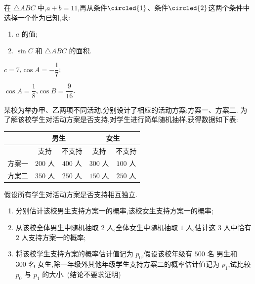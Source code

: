 \begin{problem}
在 \(\triangle ABC\) 中,\(a+b=11\),再从条件\(\circled{1}\)、条件\(\circled{2}\)这两个条件中选择一个作为已知,求:

\begin{enumerate}
    \item \(a\) 的值;
    \item \(\sin C\) 和 \(\triangle ABC\) 的面积.
\end{enumerate}

\begin{circlelist}
\item \(c=7\),\(\cos A=-\dfrac17\);

\item \(\cos A=\dfrac18\),\(\cos B=\dfrac{9}{16}\).
\end{circlelist}
\end{problem}

\begin{problem}
某校为举办甲、乙两项不同活动,分别设计了相应的活动方案:方案一、方案二. 为了解该校学生对活动方案是否支持,对学生进行简单随机抽样,获得数据如下表:

\begin{center}
\begin{tabular}{c|cc|cc}
\hline
& \multicolumn{2}{c|}{男生} & \multicolumn{2}{c}{女生} \\
\hline
& 支持 & 不支持 & 支持 & 不支持 \\
\hline
方案一 & \(200\text{ 人}\) & \(400\text{ 人}\) & \(300\text{ 人}\) & \(100\text{ 人}\) \\
方案二 & \(350\text{ 人}\) & \(250\text{ 人}\) & \(150\text{ 人}\) & \(250\text{ 人}\) \\
\hline
\end{tabular}
\end{center}

假设所有学生对活动方案是否支持相互独立.

\begin{enumerate}
    \item 分别估计该校男生支持方案一的概率,该校女生支持方案一的概率;
    \item 从该校全体男生中随机抽取 \(2\text{ 人}\),全体女生中随机抽取 \(1\text{ 人}\),估计这 \(3\text{ 人}\)中恰有 \(2\text{ 人}\)支持方案一的概率;
    \item 将该校学生支持方案的概率估计值记为 \(p_0\),假设该校年级有 \(500\text{ 名}\) 男生和 \(300\text{ 名}\) 女生,除一年级外其他年级学生支持方案二的概率估计值记为 \(p_1\),试比较 \(p_0\) 与 \(p_1\) 的大小. (结论不要求证明)
\end{enumerate}
\end{problem}

